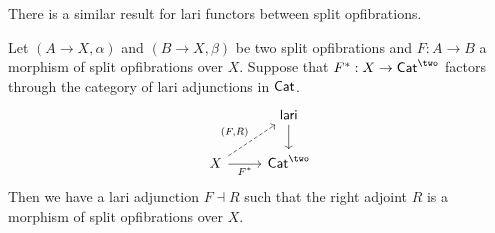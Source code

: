 There is a similar result for lari functors between split opfibrations.
\begin{lemma} \label{lem:lari-between-split-opfibs}
  Let $(A \to X, \alpha)$ and $(B \to X, \beta)$ be two
  split opfibrations and $F : A \to B$
  a morphism of split opfibrations over $X$.
  Suppose that $F^* : X \to \Cat^\two$ factors through the
  category of lari adjunctions in $\mathsf{Cat}$.
  \[
    \begin{tikzcd}
      & \lari \\
      X & {\Cat^\two}
      \arrow[from=1-2, to=2-2]
      \arrow["{(F,R)}", dashed, from=2-1, to=1-2]
      \arrow["F^*"', from=2-1, to=2-2]
    \end{tikzcd}
  \]
  Then we have a lari adjunction $F \dashv R$ such that
  the right adjoint $R$ is a morphism of split opfibrations over $X$.
\end{lemma}
